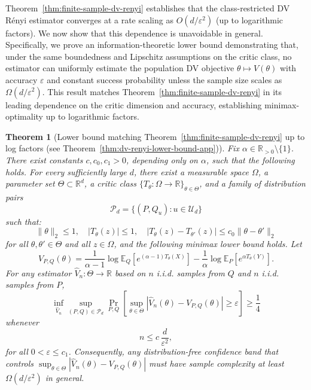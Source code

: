 \documentclass{article}
\theoremstyle{plain}
\newtheorem{theorem}{Theorem}[section]
\theoremstyle{definition}
\theoremstyle{remark}
\begin{document}
Theorem~\ref{thm:finite-sample-dv-renyi} establishes that the class-restricted DV R\'enyi estimator converges at a rate
scaling as $O(d/\varepsilon^2)$ (up to logarithmic factors).
We now show that this dependence is unavoidable in general.
Specifically, we prove an information-theoretic lower bound demonstrating that,
under the same boundedness and Lipschitz assumptions on the critic class,
no estimator can uniformly estimate the population DV objective
\(\theta\mapsto V(\theta)\)
with accuracy
$\varepsilon$ and constant success probability unless the sample size scales as
$\Omega(d/\varepsilon^2)$.
This result matches Theorem~\ref{thm:finite-sample-dv-renyi}
in its leading dependence on the critic dimension and
accuracy, establishing minimax-optimality up to logarithmic factors.

\begin{theorem}[Lower bound matching Theorem~\ref{thm:finite-sample-dv-renyi} up to log factors (see Theorem~\ref{thm:dv-renyi-lower-bound-app})]
\label{thm:dv-renyi-lower-bound}
Fix \(\alpha\in\mathbb R_{>0}\setminus\{1\}\).
There exist constants
\(c,c_0,c_1>0\), depending only on \(\alpha\), such that the following holds.
For every sufficiently large \(d\), there exist a measurable space \(\Omega\), a
parameter set \(\Theta\subset\mathbb R^d\), a critic class
\(\{T_\theta:\Omega\to\mathbb R\}_{\theta\in\Theta}\), and a family of
distribution pairs
\[
    \mathcal P_d=\{(P,Q_u):u\in\mathcal U_d\}
\]
such that:
\[
    \|\theta\|_2\le 1,\quad
    |T_\theta(z)|\le 1,\quad
    |T_\theta(z)-T_{\theta'}(z)|\le c_0\|\theta-\theta'\|_2
\]
for all \(\theta,\theta'\in\Theta\) and all \(z\in\Omega\), and the following
minimax lower bound holds. Let
\[
    V_{P,Q}(\theta)
    =
    \frac{1}{\alpha-1}
    \log \mathbb E_Q\!\left[e^{(\alpha-1)T_\theta(X)}\right]
    -
    \frac{1}{\alpha}
    \log \mathbb E_P\!\left[e^{\alpha T_\theta(Y)}\right].
\]
For any estimator \(\widehat V_n:\Theta\to\mathbb R\) based on \(n\) i.i.d.
samples from \(Q\) and \(n\) i.i.d. samples from \(P\),
\[
    \inf_{\widehat V_n}
    \sup_{(P,Q)\in\mathcal P_d}
    \Pr_{P,Q}\!\left[
        \sup_{\theta\in\Theta}
        \left|\widehat V_n(\theta)-V_{P,Q}(\theta)\right|
        \ge \varepsilon
    \right]
    \ge \frac14
\]
whenever
\[
    n \le c\,\frac{d}{\varepsilon^2},
\]
for all \(0<\varepsilon\le c_1\). Consequently, any distribution-free
confidence band that controls
\(\sup_{\theta\in\Theta}|\widehat V_n(\theta)-V_{P,Q}(\theta)|\) must have
sample complexity at least \(\Omega(d/\varepsilon^2)\) in general.
\end{theorem}
\end{document}
